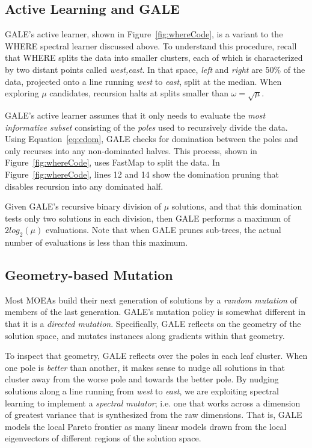 \documentclass[10pt,journal,compsoc]{IEEEtran}
\newcommand{\eq}[1]{Equation~\ref{eq:#1}}
\newcommand{\fig}[1]{Figure~\ref{fig:#1}}
\begin{document}




\subsection{Active Learning and GALE}\label{sec:al}
GALE's active learner, shown in \fig{whereCode}, is a variant to the WHERE spectral learner discussed above.
To understand this procedure, recall that WHERE splits the data into smaller clusters, each of which is characterized by two distant points called {\em west,east}. 
In that space, {\em left} and {\em right} are  50\% of the data, projected onto a line running {\em west} to {\em east}, split at the median.
When exploring $\mu$ candidates, recursion halts at splits smaller than $\omega=\sqrt{\mu}$.

GALE's active learner assumes that it only needs to evaluate
the {\em most informative subset} consisting of the {\em poles} used to
recursively divide the data. 
Using \eq{cdom}, GALE checks for domination between the poles and only recurses into any non-dominated halves.
This process, shown in \fig{whereCode}, uses FastMap to split the data. 
In  \fig{whereCode}, lines 12 and 14 show the domination pruning that disables recursion into any dominated half.


Given GALE's recursive binary division of $\mu$ solutions, and that this domination tests only two solutions in each division, then GALE performs  a maximum of $2log_2(\mu)$ evaluations. 
Note that when GALE prunes sub-trees, the actual number of evaluations is less than this maximum.


\subsection{Geometry-based Mutation}\label{sec:geom}
Most MOEAs build their next generation of solutions by a {\em random mutation} of members of the last generation. 
GALE's mutation policy is somewhat different in that it is a {\em directed mutation}.
Specifically, GALE reflects on the geometry of the solution space, and mutates instances along gradients within that geometry. 

To inspect that geometry, GALE reflects over the poles in each leaf cluster. 
When one pole is {\em better} than another, it makes sense to nudge all solutions in that cluster away from the worse pole and towards the better pole.
By nudging solutions along a line running from {\em west} to {\em east}, we are exploiting spectral learning to implement a {\em spectral mutator}; i.e. one that works across a dimension of greatest variance that is synthesized from the raw dimensions.  
That is, GALE models the local Pareto frontier as many linear models
drawn from the local eigenvectors of different
regions of the solution space. 
\end{document}
